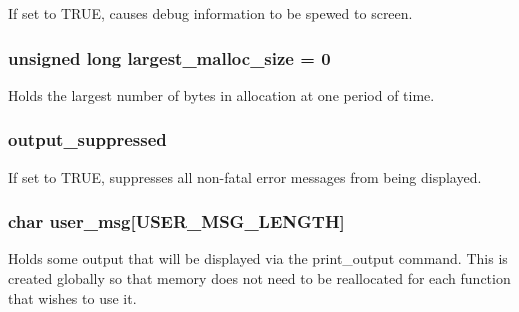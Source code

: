If set to TRUE, causes debug information to be spewed to screen. 
\subsubsection{\setlength{\rightskip}{0pt plus 5cm}unsigned long largest\_\-malloc\_\-size = 0}\label{util_8c_a3}


Holds the largest number of bytes in allocation at one period of time. 
\subsubsection{ output\_\-suppressed}\label{util_8c_a0}


If set to TRUE, suppresses all non-fatal error messages from being displayed. 
\subsubsection{\setlength{\rightskip}{0pt plus 5cm}char user\_\-msg[USER\_\-MSG\_\-LENGTH]}\label{util_8c_a4}


Holds some output that will be displayed via the print\_\-output command. This is created globally so that memory does not need to be reallocated for each function that wishes to use it. 